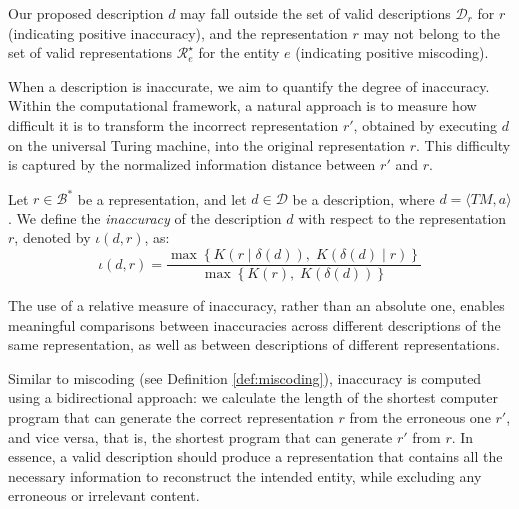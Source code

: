 Our proposed description $d$ may fall outside the set of valid descriptions $\mathcal{D}_r$ for $r$ (indicating positive inaccuracy), and the representation $r$ may not belong to the set of valid representations $\mathcal{R}^\star_e$ for the entity $e$ (indicating positive miscoding).

When a description is inaccurate, we aim to quantify the degree of inaccuracy. Within the computational framework, a natural approach is to measure how difficult it is to transform the incorrect representation $r'$, obtained by executing $d$ on the universal Turing machine, into the original representation $r$. This difficulty is captured by the normalized information distance between $r'$ and $r$.

\begin{definition} [Inaccuracy]
\label{def:inaccuracy:inaccuracy:inaccuracy}
Let $r \in \mathcal{B}^\ast$ be a representation, and let $d \in \mathcal{D}$ be a description, where $d = \langle TM, a \rangle$. We define the \emph{inaccuracy} of the description $d$ with respect to the representation $r$, denoted by $\iota(d, r)$, as:
\[
\iota(d, r) = \frac{ \max\left\{ K \left(r \mid \delta(d) \right),\; K \left( \delta(d) \mid r \right) \right\} }{ \max\left\{ K(r),\; K \left(\delta(d) \right) \right\} }
\]
\end{definition}

The use of a relative measure of inaccuracy, rather than an absolute one, enables meaningful comparisons between inaccuracies across different descriptions of the same representation, as well as between descriptions of different representations.

Similar to miscoding (see Definition \ref{def:miscoding}), inaccuracy is computed using a bidirectional approach: we calculate the length of the shortest computer program that can generate the correct representation $r$ from the erroneous one $r'$, and vice versa, that is, the shortest program that can generate $r'$ from $r$. In essence, a valid description should produce a representation that contains all the necessary information to reconstruct the intended entity, while excluding any erroneous or irrelevant content.

